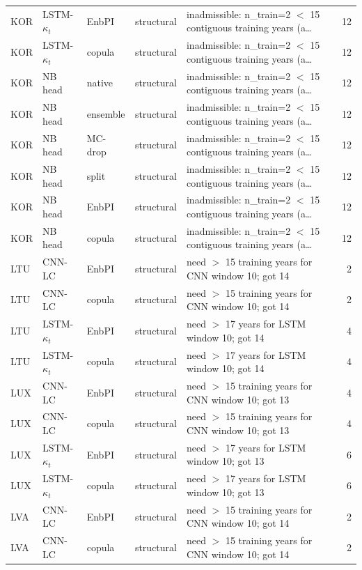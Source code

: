 {\begin{longtable}{@{}lllp{1.6cm}p{6.2cm}r@{}}
KOR & LSTM-$\kappa_t$ & EnbPI & structural & inadmissible: n\_train=2 $<$ 15 contiguous training years (a\ldots & 12 \\
KOR & LSTM-$\kappa_t$ & copula & structural & inadmissible: n\_train=2 $<$ 15 contiguous training years (a\ldots & 12 \\
KOR & NB head & native & structural & inadmissible: n\_train=2 $<$ 15 contiguous training years (a\ldots & 12 \\
KOR & NB head & ensemble & structural & inadmissible: n\_train=2 $<$ 15 contiguous training years (a\ldots & 12 \\
KOR & NB head & MC-drop & structural & inadmissible: n\_train=2 $<$ 15 contiguous training years (a\ldots & 12 \\
KOR & NB head & split & structural & inadmissible: n\_train=2 $<$ 15 contiguous training years (a\ldots & 12 \\
KOR & NB head & EnbPI & structural & inadmissible: n\_train=2 $<$ 15 contiguous training years (a\ldots & 12 \\
KOR & NB head & copula & structural & inadmissible: n\_train=2 $<$ 15 contiguous training years (a\ldots & 12 \\
LTU & CNN-LC & EnbPI & structural & need $>$ 15 training years for CNN window 10; got 14 & 2 \\
LTU & CNN-LC & copula & structural & need $>$ 15 training years for CNN window 10; got 14 & 2 \\
LTU & LSTM-$\kappa_t$ & EnbPI & structural & need $>$ 17 years for LSTM window 10; got 14 & 4 \\
LTU & LSTM-$\kappa_t$ & copula & structural & need $>$ 17 years for LSTM window 10; got 14 & 4 \\
LUX & CNN-LC & EnbPI & structural & need $>$ 15 training years for CNN window 10; got 13 & 4 \\
LUX & CNN-LC & copula & structural & need $>$ 15 training years for CNN window 10; got 13 & 4 \\
LUX & LSTM-$\kappa_t$ & EnbPI & structural & need $>$ 17 years for LSTM window 10; got 13 & 6 \\
LUX & LSTM-$\kappa_t$ & copula & structural & need $>$ 17 years for LSTM window 10; got 13 & 6 \\
LVA & CNN-LC & EnbPI & structural & need $>$ 15 training years for CNN window 10; got 14 & 2 \\
LVA & CNN-LC & copula & structural & need $>$ 15 training years for CNN window 10; got 14 & 2 \\

\end{longtable}}
